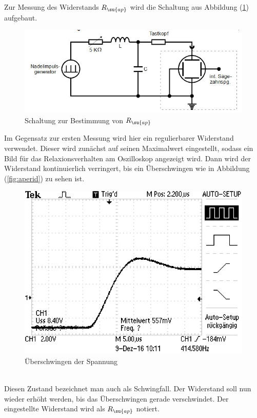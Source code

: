 Zur Messung des Widerstands $R_\su{ap}$ wird die Schaltung aus Abbildung
(\ref{fig:rapschlt}) aufgebaut. \\
\begin{figure}[h]
  \centering
  \includegraphics[width=\textwidth]{Bilder/RapSchalt.JPG}
  \caption{Schaltung zur Bestimmung von $R_\su{ap}$}
  \label{fig:rapschlt}
\end{figure}
\newpage
Im Gegensatz zur ersten Messung wird hier ein regulierbarer Widerstand verwendet.
Dieser wird zunächst auf seinen Maximalwert eingestellt, sodass ein Bild
für das Relaxionsverhalten am Oszilloskop angezeigt wird. Dann wird der
Widerstand kontinuierlich verringert, bis ein Überschwingen wie in
Abbildung (\ref{fig:aperid}) zu sehen ist.
\begin{figure}[h]
  \centering
  \includegraphics{Bilder/aperid.JPG}
  \caption{Überschwingen der Spannung}
  \label{fig:aperig}
\end{figure} \\
Diesen Zustand bezeichnet man auch als Schwingfall. Der Widerstand soll nun
wieder erhöht werden, bis das Überschwingen gerade verschwindet. Der eingestellte
Widerstand wird als $R_\su{ap}$ notiert.
